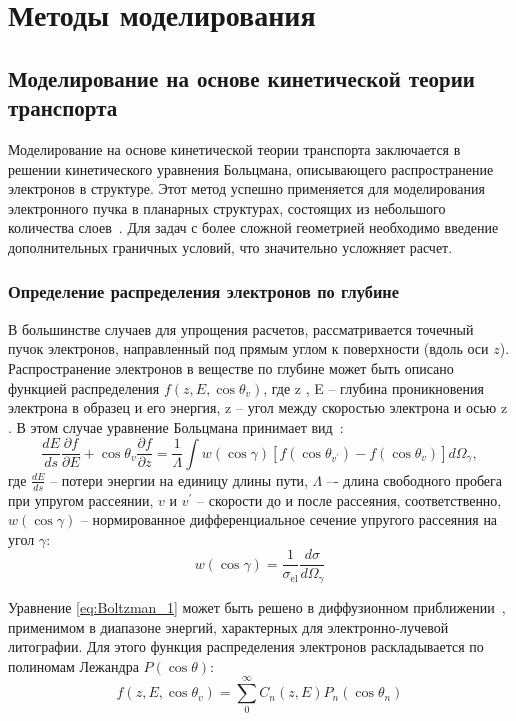\section{Методы моделирования}

\subsection{Моделирование на основе кинетической теории транспорта}
Моделирование на основе кинетической теории транспорта заключается в решении кинетического уравнения Больцмана, описывающего распространение электронов в структуре. Этот метод успешно применяется для моделирования электронного пучка в планарных структурах, состоящих из небольшого количества слоев~\cite{Stepanova_2006, Stepanova_2010}. Для задач с более сложной геометрией необходимо введение дополнительных граничных условий, что значительно усложняет расчет.

\subsubsection{Определение распределения электронов по глубине}
В большинстве случаев для упрощения расчетов, рассматривается точечный пучок электронов, направленный под прямым углом к поверхности (вдоль оси $z$). Распространение электронов в веществе по глубине может быть описано функцией распределения $f(z, E, \cos \theta_v)$, где z , E – глубина проникновения электрона в образец и его энергия, z – угол между скоростью электрона и осью z . В этом случае уравнение Больцмана принимает вид~\cite{ME_rev_60}:
\begin{equation} \label{eq:Boltzman_1}
	\frac{d E}{d s} \frac{\partial f}{\partial E}+\cos \theta_v \frac{\partial f}{\partial z}=\frac{1}{\Lambda} \int w(\cos \gamma)\left[f\left(\cos \theta_{v^{\prime}}\right)-f\left(\cos \theta_v\right)\right] d \Omega_\gamma,
\end{equation}
где $\frac{dE}{ds}$ -- потери энергии на единицу длины пути, $\Lambda$ –- длина свободного пробега при упругом рассеянии, $v$ и $v^{\prime}$ -- скорости до и после рассеяния, соответственно, $w(\cos \gamma)$ -- нормированное дифференциальное сечение упругого рассеяния на угол $\gamma$:
\begin{equation} \label{eq:Boltzman_2}
	w(\cos \gamma)=\frac{1}{\sigma_{\mathrm{el}}} \frac{d \sigma}{d \Omega_\gamma}
\end{equation}

Уравнение \ref{eq:Boltzman_1} может быть решено в диффузионном приближении~\cite{ME_rev_61}, применимом в диапазоне энергий, характерных для электронно-лучевой литографии. Для этого функция распределения электронов раскладывается по полиномам Лежандра $P(\cos \theta)$:
\begin{equation} \label{eq:Boltzman_3}
	f\left(z, E, \cos \theta_v\right)=\sum_0^{\infty} C_n(z, E) P_n\left(\cos \theta_n\right)
\end{equation}


